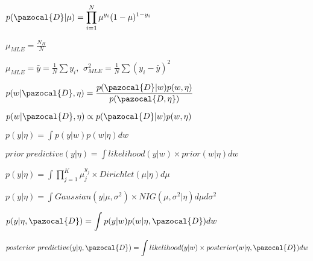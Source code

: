 \documentclass[multi={mymath},border=1pt]{standalone}
\newenvironment{mymath}{$\displaystyle}{$}
\begin{document}
	
	\begin{mymath}
		p(\pazocal{D}|\mu) = \prod_{i=1}^{N}\mu^{y_i}(1-\mu)^{1-y_i}
	\end{mymath}
	
	\begin{mymath}
		\mu_{MLE} = \frac{N_H}{N}
	\end{mymath}
	
	\begin{mymath}
		\mu_{MLE} = \bar{y} = \frac{1}{N}\sum{y_i} \text{, } \ 
		\sigma^2_{MLE} = \frac{1}{N}\sum{(y_i - \bar{y})^2}
	\end{mymath}
	
	\begin{mymath}\label{eq:posterior}
		p(w|\pazocal{D}, \eta) = \frac{p(\pazocal{D}|w)p(w, \eta)}{p(\pazocal{D, \eta})}
	\end{mymath}
	
	\begin{mymath}
		p(w|\pazocal{D}, \eta) \propto p(\pazocal{D}|w)p(w, \eta)
	\end{mymath}
	
	\begin{mymath}\label{eq:prior:predictive}
		p(y|\eta) = \int p(y|w)p(w|\eta) dw
	\end{mymath}
	
	\begin{mymath}\label{eq:prior:predictive:2}
		prior \ predictive (y|\eta) = \int likelihood(y|w) \times prior(w|\eta) dw
	\end{mymath}
	
	\begin{mymath}\label{eq:prior:predictive:dirichlet}
		p(y|\eta) = \int \prod_{j=1}^{K}\mu_j^{y_j} \times Dirichlet(\mu|\eta)d\mu
	\end{mymath}
	
	\begin{mymath}\label{eq:prior:predictive:nig}
		p(y|\eta) = \int Gaussian(y|\mu, \sigma^2)\times NIG(\mu, \sigma^2|\eta)d\mu d\sigma^2
	\end{mymath}
	
	\begin{mymath}\label{eq:posterior:predictive}
		p(y|\eta, \pazocal{D}) = \int p(y|w)p(w|\eta, \pazocal{D}) dw
	\end{mymath}
	
	\begin{mymath}\label{eq:posterior:predictive:2}
		posterior \ predictive (y|\eta, \pazocal{D}) = \int likelihood(y|w) \times posterior(w|\eta, \pazocal{D}) dw
	\end{mymath}
	
\end{document}
